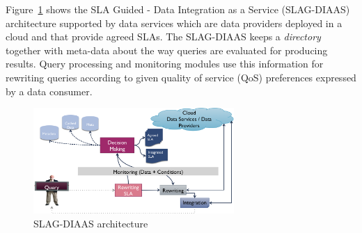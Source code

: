 \documentclass[10pt, conference, compsocconf]{IEEEtran}
\begin{document}
%
Figure~\ref{fig_sim} shows the SLA Guided - Data Integration as a Service (SLAG-DIAAS) architecture  supported by data services which are data providers deployed in a cloud and that provide agreed SLAs. 
The SLAG-DIAAS keeps a \textit{directory} together with meta-data about the way queries are evaluated for producing results.
Query processing and monitoring modules use this information for rewriting queries according to given quality of service (QoS) preferences expressed by a data consumer.
\begin{figure}[!t]
\centering
\includegraphics[width=3in]{figs/arch}
\caption{SLAG-DIAAS architecture}
\label{fig_sim}
\end{figure}
\end{document}
